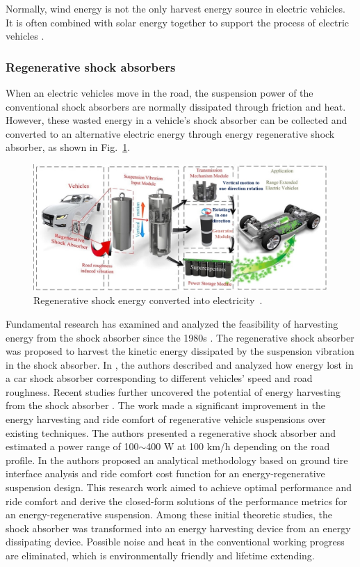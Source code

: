 Normally, wind energy is not the only harvest energy source in electric vehicles.
It is often combined with solar energy together to support the process of electric vehicles \cite{JX_8077284,JX_7006196,JX_4762597}.

\subsubsection{Regenerative shock absorbers}

When an electric vehicles move in the road, the suspension power of the conventional shock absorbers are normally dissipated through friction and heat.
However, these wasted energy in a vehicle's shock absorber can be collected and converted to an alternative electric energy through energy regenerative shock absorber, as shown in Fig.~\ref{fig:JX_shock}.

\begin{figure}
\centering
\includegraphics[width=1.0\hsize]{Figures/Jason_Xue/JX_shock.jpg}
\caption{Regenerative shock energy converted into electricity~\cite{JX_ZHANG2016177}.}
\label{fig:JX_shock}
\end{figure}      

Fundamental research has examined and analyzed the feasibility of harvesting energy from the shock absorber since the 1980s \cite{JX_ref1}.
The regenerative shock absorber was proposed to harvest the kinetic energy dissipated by the suspension vibration in the shock absorber.
In \cite{JX_ref1}, the authors described and analyzed how energy lost in a car shock absorber corresponding to different vehicles' speed and road roughness.
Recent studies further uncovered the potential of energy harvesting from the shock absorber \cite{JX_JOUR,JX_HUANG201516}.
The work \cite{JX_JOUR} made a significant improvement in the energy harvesting and ride comfort of regenerative vehicle suspensions over existing techniques.
The authors presented a regenerative shock absorber and estimated a power range of 100$\sim$400 W at 100 km/h depending on the road profile.
In \cite{JX_HUANG201516} the authors proposed an analytical methodology based on ground tire interface analysis and ride comfort cost function for an energy-regenerative suspension design.
This research work aimed to achieve optimal performance and ride comfort and derive the closed-form solutions of the performance metrics for an energy-regenerative suspension.
Among these initial theoretic studies, the shock absorber was transformed into an energy harvesting device from an energy dissipating device.
Possible noise and heat in the conventional working progress are eliminated, which is environmentally friendly and lifetime extending.

